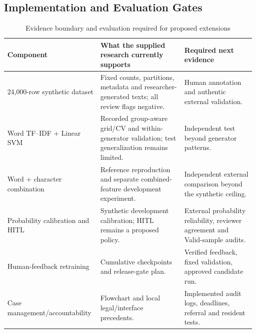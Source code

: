 \subsection{Implementation and Evaluation Gates}
\begin{table}[H]\centering\small\caption{Evidence boundary and evaluation required for proposed extensions}\label{tab:op-evidence}\begin{tabularx}{\textwidth}{p{}Xp{}}\toprule
Component & What the supplied research currently supports & Required next evidence\\\midrule
24,000-row synthetic dataset & Fixed counts, partitions, metadata and researcher-generated texts; all review flags negative. & Human annotation and authentic external validation.\\
Word TF--IDF + Linear SVM & Recorded group-aware grid/CV and within-generator validation; test generalization remains limited. & Independent test beyond generator patterns.\\
Word + character combination & Reference reproduction and separate combined-feature development experiment. & Independent external comparison beyond the synthetic ceiling.\\
Probability calibration and HITL & Synthetic development calibration; HITL remains a proposed policy. & External probability reliability, reviewer agreement and Valid-sample audits.\\
Human-feedback retraining & Cumulative checkpoints and release-gate plan. & Verified feedback, fixed validation, approved candidate run.\\
Case management/accountability & Flowchart and local legal/interface precedents. & Implemented audit logs, deadlines, referral and resident tests.\\\bottomrule
\end{tabularx}\end{table}

